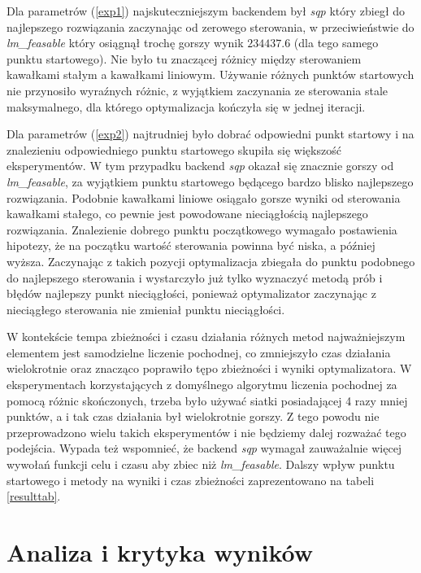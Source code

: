 \documentclass[11pt]{article}
\begin{document}
Dla parametrów (\ref{exp1}) najskuteczniejszym backendem był {\it sqp\/} który zbiegł do najlepszego rozwiązania zaczynając od zerowego sterowania, w przeciwieństwie do {\it lm\_feasable\/} który osiągnął trochę gorszy wynik $234437.6$ (dla tego samego punktu startowego). Nie było tu znaczącej różnicy między sterowaniem kawałkami stałym a kawałkami liniowym. Używanie różnych punktów startowych nie przynosiło wyraźnych różnic, z wyjątkiem zaczynania ze sterowania stale maksymalnego, dla którego optymalizacja kończyła się w jednej iteracji.

Dla parametrów (\ref{exp2}) najtrudniej było dobrać odpowiedni punkt startowy i na znalezieniu odpowiedniego punktu startowego skupiła się większość eksperymentów. W tym przypadku backend {\it sqp\/} okazał się znacznie gorszy od {\it lm\_feasable}, za wyjątkiem punktu startowego będącego bardzo blisko najlepszego rozwiązania. Podobnie kawałkami liniowe osiągało gorsze wyniki od sterowania kawałkami stałego, co pewnie jest powodowane nieciągłością  najlepszego rozwiązania. Znalezienie dobrego punktu początkowego wymagało postawienia hipotezy, że na początku wartość sterowania powinna być niska, a później wyższa. Zaczynając z takich pozycji optymalizacja zbiegała do punktu podobnego do najlepszego sterowania i wystarczyło już tylko wyznaczyć metodą prób i błędów najlepszy punkt nieciągłości, ponieważ optymalizator zaczynając z nieciągłego sterowania nie zmieniał punktu nieciągłości.

W kontekście tempa zbieżności i czasu działania różnych metod najważniejszym elementem jest samodzielne liczenie pochodnej, co zmniejszyło czas działania wielokrotnie oraz znacząco poprawiło tępo zbieżności i wyniki optymalizatora. W eksperymentach korzystających z domyślnego algorytmu liczenia pochodnej za pomocą różnic skończonych, trzeba było używać siatki posiadającej 4 razy mniej punktów, a i tak czas działania był wielokrotnie gorszy. Z tego powodu nie przeprowadzono wielu takich eksperymentów i nie będziemy dalej rozważać tego podejścia. Wypada też wspomnieć, że backend {\it sqp\/} wymagał zauważalnie więcej wywołań funkcji celu i czasu aby zbiec niż {\it lm\_feasable}. Dalszy wpływ punktu startowego i metody na wyniki i czas zbieżności zaprezentowano na tabeli \ref{resulttab}.
  
\section{Analiza i krytyka wyników}
\end{document}
